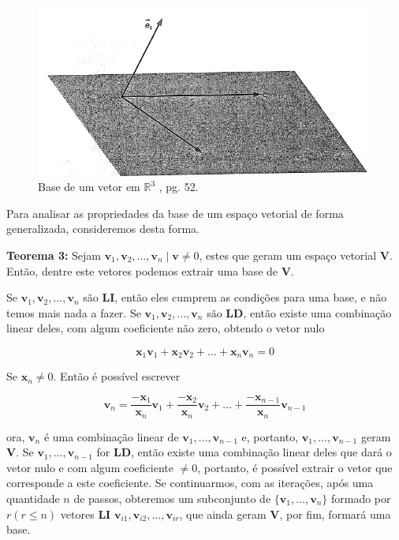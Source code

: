 \begin{figure}[H]
	\centering
	\includegraphics[scale=0.90]{b_v3.png}
	\caption{Base de um vetor em $\mathbb{R}^3$ \cite{camargo2005}, pg. 52.}
\end{figure}

Para analisar as propriedades da base de um espaço vetorial de forma generalizada, consideremos desta forma.

\noindent\textbf{Teorema 3:} Sejam $\mathbf{v}_1, \mathbf{v}_2, \ldots, \mathbf{v}_n \mid \mathbf{v} \neq 0$, estes que geram um espaço vetorial $\mathbf{V}$. Então, dentre este vetores podemos extrair uma base de $\mathbf{V}$.

Se $\mathbf{v}_1, \mathbf{v}_2, \ldots, \mathbf{v}_n$ são \textbf{LI}, então eles cumprem as condições para uma base, e não temos mais nada a fazer. Se $\mathbf{v}_1, \mathbf{v}_2, \ldots, \mathbf{v}_n$ são \textbf{LD}, então existe uma combinação linear deles, com algum coeficiente não zero, obtendo o vetor nulo

\begin{equation}
\mathbf{x}_1\mathbf{v}_1 + \mathbf{x}_2\mathbf{v}_2 + \ldots + \mathbf{x}_n\mathbf{v}_n = 0
\end{equation}

Se $\mathbf{x}_n \neq 0$. Então é possível escrever

\begin{equation}
\mathbf{v}_n = \frac{-\mathbf{x}_1}{\mathbf{x}_n}\mathbf{v}_1 + \frac{-\mathbf{x}_2}{\mathbf{x}_n}\mathbf{v}_2 + \ldots + \frac{-\mathbf{x}_{n -1}}{\mathbf{x}_n}\mathbf{v}_{n -1}
\end{equation}

ora, $\mathbf{v}_n$ é uma combinação linear de $\mathbf{v}_1, \ldots, \mathbf{v}_{n -1}$ e, portanto, $\mathbf{v}_1, \ldots, \mathbf{v}_{n -1}$ geram $\mathbf{V}$. Se $\mathbf{v}_1, \ldots, \mathbf{v}_{n -1}$ for \textbf{LD}, então existe uma combinação linear deles que dará o vetor nulo e com algum coeficiente $\neq 0$, portanto, é possível extrair o vetor que corresponde a este coeficiente. Se continuarmos, com as iterações, após uma quantidade $n$ de passos, obteremos um subconjunto de $\{\mathbf{v}_1, \ldots, \mathbf{v}_n\}$ formado por $r(r \leqslant n)$ vetores \textbf{LI} $\mathbf{v}_{i1}, \mathbf{v}_{i2}, \ldots, \mathbf{v}_{ir}$, que ainda geram $\mathbf{V}$, por fim, formará uma base.

